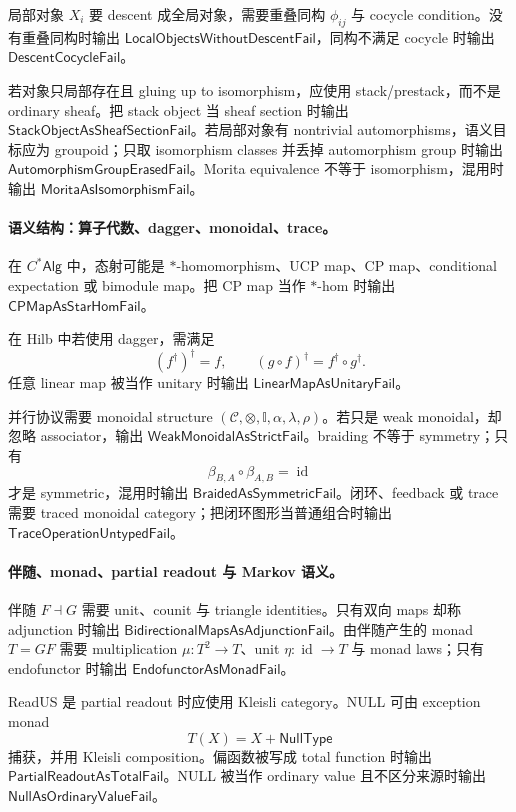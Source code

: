 局部对象 \(X_i\) 要 descent 成全局对象，需要重叠同构 \(\phi_{ij}\) 与 cocycle condition。没有重叠同构时输出 \(\mathsf{LocalObjectsWithoutDescentFail}\)，同构不满足 cocycle 时输出 \(\mathsf{DescentCocycleFail}\)。

若对象只局部存在且 gluing up to isomorphism，应使用 stack/prestack，而不是 ordinary sheaf。把 stack object 当 sheaf section 时输出 \(\mathsf{StackObjectAsSheafSectionFail}\)。若局部对象有 nontrivial automorphisms，语义目标应为 groupoid；只取 isomorphism classes 并丢掉 automorphism group 时输出 \(\mathsf{AutomorphismGroupErasedFail}\)。Morita equivalence 不等于 isomorphism，混用时输出 \(\mathsf{MoritaAsIsomorphismFail}\)。

\paragraph{语义结构：算子代数、dagger、monoidal、trace。}
在 \(C^*\mathsf{Alg}\) 中，态射可能是 \(*\)-homomorphism、UCP map、CP map、conditional expectation 或 bimodule map。把 CP map 当作 \(*\)-hom 时输出 \(\mathsf{CPMapAsStarHomFail}\)。

在 Hilb 中若使用 dagger，需满足
\[
(f^\dagger)^\dagger=f,\qquad
(g\circ f)^\dagger=f^\dagger\circ g^\dagger.
\]
任意 linear map 被当作 unitary 时输出 \(\mathsf{LinearMapAsUnitaryFail}\)。

并行协议需要 monoidal structure \((\mathcal C,\otimes,\mathbb I,\alpha,\lambda,\rho)\)。若只是 weak monoidal，却忽略 associator，输出 \(\mathsf{WeakMonoidalAsStrictFail}\)。braiding 不等于 symmetry；只有
\[
\beta_{B,A}\circ\beta_{A,B}=\operatorname{id}
\]
才是 symmetric，混用时输出 \(\mathsf{BraidedAsSymmetricFail}\)。闭环、feedback 或 trace 需要 traced monoidal category；把闭环图形当普通组合时输出 \(\mathsf{TraceOperationUntypedFail}\)。

\paragraph{伴随、monad、partial readout 与 Markov 语义。}
伴随 \(F\dashv G\) 需要 unit、counit 与 triangle identities。只有双向 maps 却称 adjunction 时输出 \(\mathsf{BidirectionalMapsAsAdjunctionFail}\)。由伴随产生的 monad \(T=GF\) 需要 multiplication \(\mu:T^2\to T\)、unit \(\eta:\operatorname{id}\to T\) 与 monad laws；只有 endofunctor 时输出 \(\mathsf{EndofunctorAsMonadFail}\)。

ReadUS 是 partial readout 时应使用 Kleisli category。NULL 可由 exception monad
\[
T(X)=X+\mathsf{NullType}
\]
捕获，并用 Kleisli composition。偏函数被写成 total function 时输出 \(\mathsf{PartialReadoutAsTotalFail}\)。NULL 被当作 ordinary value 且不区分来源时输出 \(\mathsf{NullAsOrdinaryValueFail}\)。

